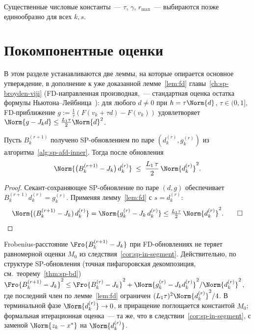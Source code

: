 Существенные числовые константы~--- $\tau$, $\gamma$, $r_{\max}$~---
выбираются позже единообразно для всех $k, s$.

\section{Покомпонентные оценки}
\label{sec:app-afd:components}

В этом разделе устанавливаются две леммы, на которые опирается основное
утверждение, в дополнение к уже доказанной лемме~\ref{lem:fd}
главы~\ref{ch:sp-broyden-viji} (FD-направленная производная,~---
стандартная оценка остатка формулы Ньютона--Лейбница~\cite[Lemma~4.1.12]{dennis1996}):
для любого $d \ne 0$ при $h = \tau \Norm{d}$, $\tau \in (0, 1]$, FD-приближение
$g := \tfrac{1}{\tau}(F(v_k + \tau d) - F(v_k))$ удовлетворяет
$\Norm{g - J_k d} \le \tfrac{L_1 \tau}{2}\Norm{d}^2$.

\begin{lemma}
\label{lem:app-afd:dirbound}
Пусть $B_k^{(r+1)}$ получено SP-обновлением по паре $(d^{(r)}_k, g^{(r)}_k)$ из
алгоритма~\ref{alg:sp-afd-inner}. Тогда после обновления
\begin{equation}
\Norm{\bigl(B_k^{(r+1)} - J_k\bigr)\, d^{(r)}_k}
\;\le\;
\frac{L_1\, \tau}{2}\,\Norm{d^{(r)}_k}^{2}.
\label{eq:app-afd:dirbound}
\end{equation}
\end{lemma}

\begin{proof}
Секант-сохраняющее SP-обновление по паре $(d, g)$ обеспечивает
$B_k^{(r+1)} d^{(r)}_k = g^{(r)}_k$. Применяя лемму~\ref{lem:fd}
с $s = d^{(r)}_k$:
\[
\Norm{(B_k^{(r+1)} - J_k)\, d^{(r)}_k}
= \Norm{g^{(r)}_k - J_k\, d^{(r)}_k}
\le \tfrac{L_1 \tau}{2}\,\Norm{d^{(r)}_k}^{2}. \qed
\]
\end{proof}

\begin{remark}
\label{rem:app-afd:M0-preserved}
Frobenius-расстояние $\Fro{B_k^{(r+1)} - J_k}$ при FD-обновлениях
не теряет равномерной оценки $M_0$ из следствия~\ref{cor:sp-in-segment}.
Действительно, по структуре SP-обновления (точная пифагоровская
декомпозиция, см.\ теорему~\ref{thm:sp-bd})
$\Fro{B_k^{(r+1)} - J_k}^2 \le \Fro{B_k^{(r)} - J_k}^2 +
\Norm{g^{(r)}_k - J_k d^{(r)}_k}^2/\Norm{d^{(r)}_k}^2$, где
последний член по лемме~\ref{lem:fd} ограничен
$(L_1\tau)^2\Norm{d^{(r)}_k}^2/4$. В терминальной фазе
$\Norm{d^{(r)}_k}\to 0$, и приращение поглощается константой $M_0$;
формальная итерационная оценка~--- та же, что в
следствии~\ref{cor:sp-in-segment}, с заменой $\Norm{z_k - x^{*}}$ на
$\Norm{d^{(r)}_k}$.
\end{remark}

